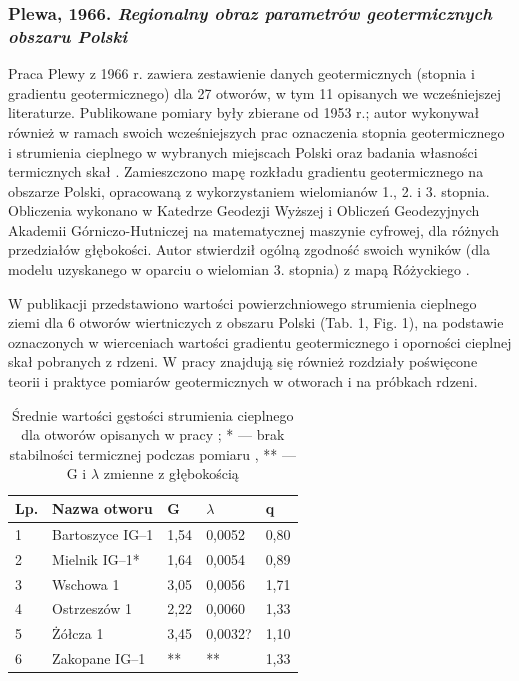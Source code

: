 \documentclass[11.5pt,twoside]{report}
\newcommand{\ct}[1]{\ignorespaces} %
\begin{document}
\subsubsection{Plewa, 1966. \textit{Regionalny obraz parametrów geotermicznych obszaru Polski}}
Praca Plewy z 1966 r. zawiera zestawienie danych geotermicznych (stopnia i gradientu geotermicznego) dla 27 otworów, w tym 11 opisanych we wcześniejszej literaturze. Publikowane pomiary były zbierane od 1953 r.; autor wykonywał również w ramach swoich wcześniejszych prac oznaczenia stopnia geotermicznego i strumienia cieplnego w wybranych miejscach Polski oraz badania własności termicznych skał \ct{parencite{Plewa.1961,Plewa.1963a,Plewa.1963b,Plewa.1965}}. Zamieszczono mapę rozkładu gradientu geotermicznego na obszarze Polski, opracowaną z wykorzystaniem wielomianów 1., 2. i 3. stopnia. Obliczenia wykonano w Katedrze Geodezji Wyższej i Obliczeń Geodezyjnych Akademii Górniczo-Hutniczej na matematycznej maszynie cyfrowej, dla różnych przedziałów głębokości. Autor stwierdził ogólną zgodność swoich wyników (dla modelu uzyskanego w oparciu o wielomian 3. stopnia) z mapą Różyckiego \citeyear{Rozycki.1948}. 

W publikacji przedstawiono wartości powierzchniowego strumienia cieplnego ziemi dla 6 otworów wiertniczych z obszaru Polski (Tab. 1, Fig. 1), na podstawie oznaczonych w wierceniach wartości gradientu geotermicznego i oporności cieplnej skał pobranych z rdzeni. W pracy znajdują się również rozdziały poświęcone teorii i praktyce pomiarów geotermicznych w otworach i na próbkach rdzeni. 

\begin{table}[h]
	\centering
	\caption{Średnie wartości gęstości strumienia cieplnego dla otworów opisanych w pracy \cite{Plewa.1966}; * --- brak stabilności termicznej podczas pomiaru \parencite{Plewa.1994}, ** --- G i $\lambda$ zmienne z głębokością \parencite{Plewa.1966}}
	\label{my-label}
	\begin{tabular}{@{}lllll@{}}
		\toprule
		Lp. & Nazwa otworu     & G    & $\lambda$ & q    \\ \midrule
		1   & Bartoszyce IG--1 & 1,54 & 0,0052                 & 0,80 \\
		2   & Mielnik IG--1*    & 1,64 & 0,0054                 & 0,89 \\
		3   & Wschowa 1        & 3,05 & 0,0056                 & 1,71 \\
		4   & Ostrzeszów 1     & 2,22 & 0,0060                 & 1,33 \\
		5   & Żółcza 1         & 3,45 & 0,0032?                & 1,10 \\
		6   & Zakopane IG--1   & **    & **                      & 1,33 \\ \bottomrule
	\end{tabular}
\end{table}
\end{document}
